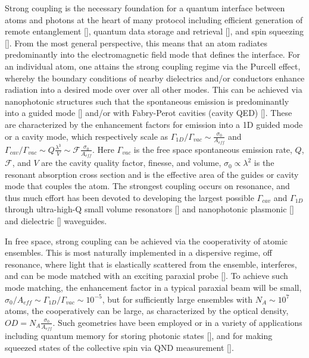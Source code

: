 \documentclass[preprint,aps,pra,onecolumn]{revtex4-1} %
\begin{document}
Strong coupling is the necessary foundation for a quantum interface between atoms and photons at the heart of many protocol including efficient generation of remote entanglement [], quantum data storage and retrieval [], and  spin squeezing []. From the most general perspective, this means that an atom radiates predominantly into the electromagnetic field mode that defines the interface.  For an individual atom, one attains the strong coupling regime via the Purcell effect, whereby the boundary conditions of nearby dielectrics and/or conductors enhance radiation into a desired mode over over all other modes.  This can be achieved via nanophotonic structures such that the spontaneous emission is predominantly into a guided mode [] and/or with Fabry-Perot cavities (cavity QED) [].   These are characterized by the enhancement factors for emission into a 1D guided mode or a cavity mode, which respectively scale as  $ \Gamma_{1D}/\Gamma_{vac} \sim \frac{\sigma_0}{A_{eff}}$ and  $\Gamma_{cav}/\Gamma_{vac} \sim   Q \frac{\lambda^3}{V}\sim \mathcal{F}  \frac{\sigma_0}{A_{eff}}$.  Here $\Gamma_{vac}$ is the free space spontaneous emission rate, $Q$, $\mathcal{F}$, and $V$ are the cavity quality factor, finesse, and volume, $\sigma_0 \propto \lambda^2$ is the resonant absorption cross section and is the effective area of the guides or cavity mode that couples the atom.  The strongest coupling occurs on resonance, and thus much effort has been devoted to developing the largest possible $\Gamma_{cav}$ and $\Gamma_{1D}$ through ultra-high-Q small volume resonators [] and nanophotonic plasmonic [] and dielectric [] waveguides.  

In free space, strong coupling can be achieved via the cooperativity of atomic ensembles.  This is most naturally implemented in a dispersive regime, off resonance, where light that is elastically scattered from the ensemble, interferes, and can be mode matched with an exciting paraxial probe [].  To achieve such mode matching, the enhancement factor in a typical paraxial beam will be small, $\sigma_0/A_{eff} \sim \Gamma_{1D}/\Gamma_{vac} \sim 10^{-5}$, but for sufficiently large ensembles with $N_A \sim 10^7$ atoms, the cooperatively can be large, as characterized by the optical density, $OD = N_A \frac{\sigma_0}{A_{eff}}$.  Such geometries have been employed or in a variety of applications including quantum memory for storing photonic states [], and for  making squeezed states of the collective spin via QND measurement [].   
\end{document}
